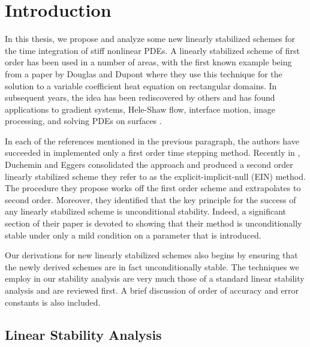 \chapter{Introduction}
In this thesis, we propose and analyze some new linearly stabilized schemes for the time integration of stiff nonlinear PDEs. A linearly stabilized scheme of first order has been used in a number of areas, with the first known example being from a paper by Douglas and Dupont \cite{douglas1971alternating} where they use this technique for the solution to a variable coefficient heat equation on rectangular domains. In subsequent years, the idea has been rediscovered by others \cite{eyre1998unconditionally,smereka2003semi} and has found applications to gradient systems, Hele-Shaw flow, interface motion, image processing, and solving PDEs on surfaces \cite{eyre1998bunconditionally,salac2008local,glasner2002diffuse,schonlieb2011unconditionally,macdonald2009implicit}.

In each of the references mentioned in the previous paragraph, the authors have succeeded in implemented only a first order time stepping method. Recently in \cite{duchemin2014explicit},  Duchemin and Eggers consolidated the approach and produced a second order linearly stabilized scheme they refer to as the explicit-implicit-null (EIN) method. The procedure they propose works off the first order scheme and extrapolates to second order. Moreover, they identified that the key principle for the success of any linearly stabilized scheme is unconditional stability. Indeed, a significant section of their paper is devoted to showing that their method is unconditionally stable under only a mild condition on a parameter that is introduced.

Our derivations for new linearly stabilized schemes also begins by ensuring that the newly derived schemes are in fact unconditionally stable. The techniques we employ in our stability analysis are very much those of a standard linear stability analysis and are reviewed first. A brief discussion of order of accuracy and error constants is also included. 

\section{Linear Stability Analysis}
